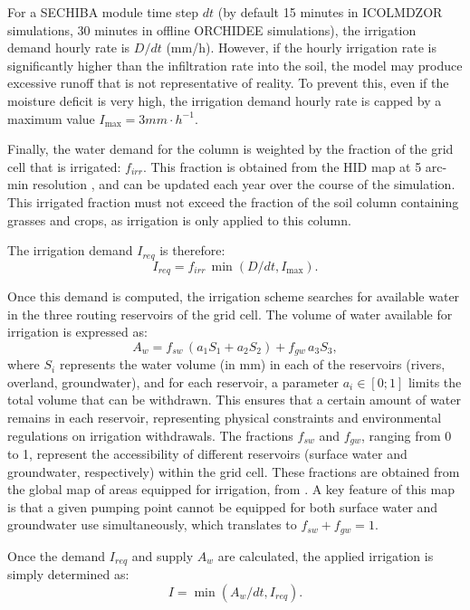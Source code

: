 For a SECHIBA module time step $dt$ (by default 15 minutes in ICOLMDZOR simulations, 30 minutes in offline ORCHIDEE simulations), the irrigation demand hourly rate is $D/dt$ (mm/h). However, if the hourly irrigation rate is significantly higher than the infiltration rate into the soil, the model may produce excessive runoff that is not representative of reality. To prevent this, even if the moisture deficit is very high, the irrigation demand hourly rate is capped by a maximum value $I_{\max} = 3 mm \cdot h^{-1}$.

Finally, the water demand for the column is weighted by the fraction of the grid cell that is irrigated: $f_{irr}$. This fraction is obtained from the HID map at 5 arc-min resolution \citep{siebert_quantifying_2010}, and can be updated each year over the course of the simulation.
This irrigated fraction must not exceed the fraction of the soil column containing grasses and crops, as irrigation is only applied to this column.

The irrigation demand $I_{req}$ is therefore:
\begin{equation}
    I_{req} = f_{irr} \, \min(D/dt, I_{\max}).
\end{equation}

Once this demand is computed, the irrigation scheme searches for available water in the three routing reservoirs of the grid cell.
The volume of water available for irrigation is expressed as:
\begin{equation}
    A_w = f_{sw} \, (a_1 S_1 + a_2 S_2)+ f_{gw} \, a_3 S_3,
\end{equation}
where $S_i$ represents the water volume (in mm) in each of the reservoirs (rivers, overland, groundwater), and for each reservoir, a parameter $a_i \in [0;1]$ limits the total volume that can be withdrawn. This ensures that a certain amount of water remains in each reservoir, representing physical constraints and environmental regulations on irrigation withdrawals.
The fractions $f_{sw}$ and $f_{gw}$, ranging from 0 to 1, represent the accessibility of different reservoirs (surface water and groundwater, respectively) within the grid cell. These fractions are obtained from the global map of areas equipped for irrigation, from \citet{siebert_groundwater_2010}. A key feature of this map is that a given pumping point cannot be equipped for both surface water and groundwater use simultaneously, which translates to $f_{sw} + f_{gw} =1$.

Once the demand $I_{req}$ and supply $A_w$ are calculated, the applied irrigation is simply  determined as:
\begin{equation}
    I = \min(A_w/dt, I_{req}).
\end{equation}

